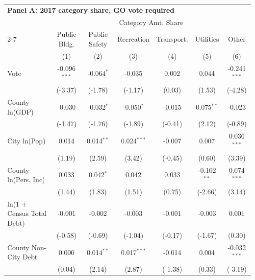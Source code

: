 \begingroup
\centering
\begin{tabular*}{\textwidth}{@{\extracolsep{\fill}}lcccccc}
\multicolumn{5}{l}{\textbf{Panel A: 2017 category share, GO vote required}}\\

\addlinespace
   \toprule
    & \multicolumn{6}{c}{Category Amt. Share}\\
   \cmidrule(lr){2-7}
                             & Public Bldg.   & Public Safety & Recreation    & Transport.    & Utilities     & Other \\   
                             & (1)            & (2)           & (3)           & (4)           & (5)           & (6)\\  
   \midrule 
   Vote                      & -0.096$^{***}$ & -0.064$^{*}$  & -0.035        & 0.002         & 0.044         & -0.241$^{***}$\\   
                             & (-3.37)       & (-1.78)      & (-1.17)      & (0.03)       & (1.53)       & (-4.28)\\   
   County ln(GDP)            & -0.030         & -0.032$^{*}$  & -0.050$^{*}$  & -0.015        & 0.075$^{**}$  & -0.023\\   
                             & (-1.47)       & (-1.76)      & (-1.89)      & (-0.41)      & (2.12)       & (-0.89)\\   
   City ln(Pop)              & 0.014          & 0.014$^{**}$  & 0.024$^{***}$ & -0.007        & 0.007         & 0.036$^{***}$\\   
                             & (1.19)        & (2.59)       & (3.42)       & (-0.45)      & (0.60)       & (3.39)\\   
   County ln(Pers. Inc)      & 0.033          & 0.042$^{*}$   & 0.042         & 0.033         & -0.102$^{**}$ & 0.074$^{***}$\\   
                             & (1.44)        & (1.83)       & (1.51)       & (0.75)       & (-2.66)      & (3.14)\\   
   ln(1 + Census Total Debt) & -0.001         & -0.002        & -0.003        & -0.001        & -0.003        & 0.001\\   
                             & (-0.58)       & (-0.69)      & (-1.04)      & (-0.17)      & (-1.67)      & (0.30)\\   
   County Non-City Debt      & 0.000          & 0.014$^{**}$  & 0.017$^{***}$ & -0.014        & 0.004         & -0.032$^{***}$\\   
                             & (0.04)        & (2.14)       & (2.87)       & (-1.38)      & (0.33)       & (-3.19)\\   

\end{tabular*}
